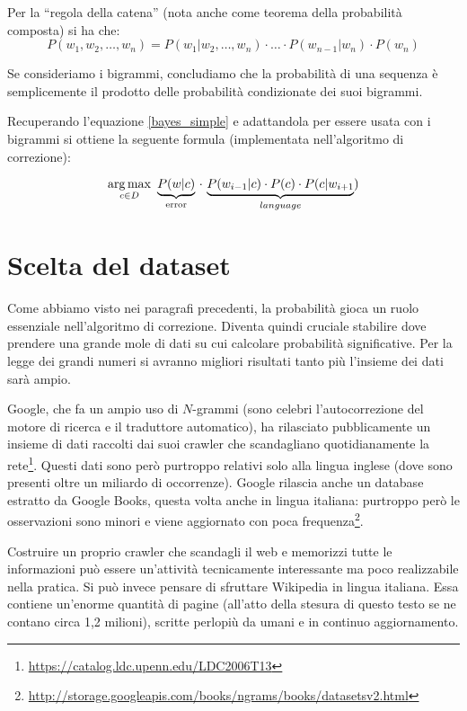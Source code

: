 Per la ``regola della catena'' (nota anche come teorema della probabilità composta) si ha che:
\begin{equation}
P(w_1, w_2, \ldots, w_n) =  P(w_1|w_2, \ldots, w_n) \cdot \ldots \cdot P(w_{n-1}|w_n) \cdot P(w_n)
\end{equation}

Se consideriamo i bigrammi, concludiamo che la probabilità di una sequenza è semplicemente il prodotto delle probabilità condizionate dei suoi bigrammi.

Recuperando l'equazione \eqref{bayes_simple} e adattandola per essere usata con i bigrammi si ottiene la seguente formula (implementata nell'algoritmo di correzione):

\begin{equation}
\label{prob_finale}
\operatorname*{arg\,max}_{c \in D} \, \, \underbrace{P(w|c)}_\text{error} \, \cdot \, \underbrace{P(w_{i-1}|c) \cdot P(c) \cdot P(c|w_{i+1}}_{language})
\end{equation}

\section{Scelta del dataset}

Come abbiamo visto nei paragrafi precedenti, la probabilità gioca un ruolo essenziale nell'algoritmo di correzione. Diventa quindi cruciale stabilire dove prendere una grande mole di dati su cui calcolare probabilità significative. Per la legge dei grandi numeri si avranno migliori risultati tanto più l'insieme dei dati sarà ampio. 

Google, che fa un ampio uso di $N$-grammi (sono celebri l'autocorrezione del motore di ricerca e il traduttore automatico), ha rilasciato pubblicamente un insieme di dati raccolti dai suoi crawler che scandagliano quotidianamente la rete\footnote{\url{https://catalog.ldc.upenn.edu/LDC2006T13}}. Questi dati sono però purtroppo relativi solo alla lingua inglese (dove sono presenti oltre un miliardo di occorrenze). Google rilascia anche un database estratto da Google Books, questa volta anche in lingua italiana: purtroppo però le osservazioni sono minori e viene aggiornato con poca frequenza\footnote{\url{http://storage.googleapis.com/books/ngrams/books/datasetsv2.html}}.

Costruire un proprio crawler che scandagli il web e memorizzi tutte le informazioni può essere un'attività tecnicamente interessante ma poco realizzabile nella pratica. Si può invece pensare di sfruttare Wikipedia in lingua italiana. Essa contiene un'enorme quantità di pagine (all'atto della stesura di questo testo se ne contano circa 1,2 milioni), scritte perlopiù da umani e in continuo aggiornamento.

